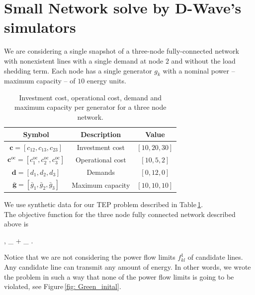 \section{Small Network solve by D-Wave's simulators}
 We are considering a single snapshot of a three-node fully-connected network with nonexistent lines with a single demand at node $2$ and without the load shedding term. Each node has a single generator $g_{k}$ with a nominal power -- maximum capacity -- of $10$ energy units.
 \begin{table}[H]
\centering
\begin{tabular}{ |c |c| c| }
  \hline			
  \textbf{Symbol} & \textbf{Description} & \textbf{Value}  \\
    \hline		
   $\mathbf{c} = \left[c_{12},c_{13},c_{23}\right]$ & Investment cost & $\left[10, 20, 30\right]$\\
       \hline		
   $\mathbf{c}^{\text{oc}} = \left[c_{1}^{\text{oc}},c_{2}^{\text{oc}}, c_{3}^{\text{oc}}\right]$ & Operational cost & $\left[10, 5, 2\right]$\\
          \hline		
   $\mathbf{d} = \left[d_{1}, d_{2}, d_{3}\right]$ & Demands & $\left[0, 12, 0\right]$\\
       \hline		
   $\mathbf{\bar{g}} = \left[\bar{g}_{1},\bar{g}_{2},\bar{g}_{3}\right]$ & Maximum capacity & $\left[10, 10, 10\right]$\\
        \hline	
\end{tabular}
\caption{Investment cost, operational cost, demand and maximum capacity per generator for a three node network.}
\label{tab:SmallNetwork}
\end{table}
We use synthetic data for our TEP problem described in Table\,\ref{tab:SmallNetwork}.\\
The objective function for the three node fully connected network described above is
\begin{mini!}[2]
	{, }{_{} + _{}}{}{}{}
    .
    \end{mini!}
Notice that we are not considering the power flow limits $f_{kl}^{1}$ of candidate lines. Any candidate line can transmit any amount of energy. In other words, we wrote the problem in such a way that none of the power flow limits is going to be violated, see Figure\,\ref{fig: Green_inital}.
